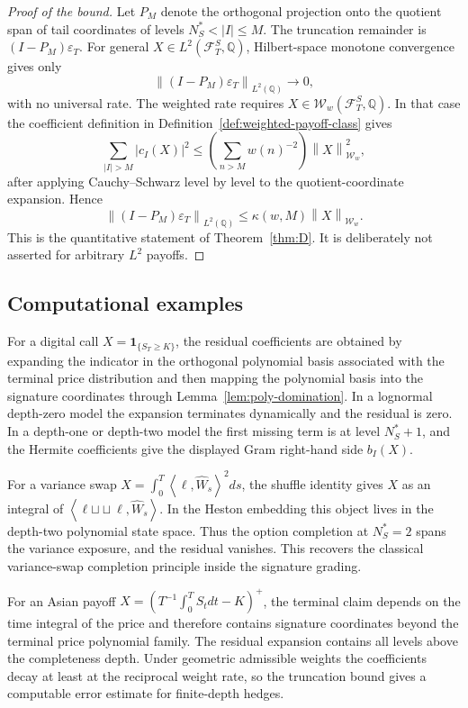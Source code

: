 \documentclass[11pt,oneside]{article}
\theoremstyle{plain}
\theoremstyle{definition}
\theoremstyle{remark}
\newcommand{\Q}{\mathbb{Q}}
\newcommand{\cW}{\widehat W}
\newcommand{\FS}{\mathcal F^S}
\newcommand{\sh}{\mathbin{\sqcup\!\sqcup}}
\newcommand{\norm}[1]{\left\lVert #1\right\rVert}
\newcommand{\abs}[1]{\left\lvert #1\right\rvert}
\newcommand{\inner}[2]{\left\langle #1,#2\right\rangle}
\begin{document}
\begin{proof}[Proof of the bound]
Let $P_M$ denote the orthogonal projection onto the quotient span of tail coordinates of levels $N_S^\ast<|I|\leq M$. The truncation remainder is $(I-P_M)\varepsilon_T$. For general $X\in L^2(\FS_T,\Q)$, Hilbert-space monotone convergence gives only
\[
\norm{(I-P_M)\varepsilon_T}_{L^2(\Q)}\to0,
\]
with no universal rate. The weighted rate requires $X\in\mathcal W_w(\FS_T,\Q)$. In that case the coefficient definition in Definition~\ref{def:weighted-payoff-class} gives
\[
\sum_{|I|>M}\abs{c_I(X)}^2
\leq
\left(\sum_{n>M}w(n)^{-2}\right)\norm{X}_{\mathcal W_w}^2,
\]
after applying Cauchy--Schwarz level by level to the quotient-coordinate expansion. Hence
\[
\norm{(I-P_M)\varepsilon_T}_{L^2(\Q)}
\leq
\kappa(w,M)\norm{X}_{\mathcal W_w}.
\]
This is the quantitative statement of Theorem~\ref{thm:D}. It is deliberately not asserted for arbitrary $L^2$ payoffs.
\end{proof}

\subsection{Computational examples}

For a digital call $X=\mathbf 1_{\{S_T\geq K\}}$, the residual coefficients are obtained by expanding the indicator in the orthogonal polynomial basis associated with the terminal price distribution and then mapping the polynomial basis into the signature coordinates through Lemma~\ref{lem:poly-domination}. In a lognormal depth-zero model the expansion terminates dynamically and the residual is zero. In a depth-one or depth-two model the first missing term is at level $N_S^\ast+1$, and the Hermite coefficients give the displayed Gram right-hand side $b_I(X)$.

For a variance swap $X=\int_0^T\inner{\ell}{\cW_s}^2ds$, the shuffle identity gives $X$ as an integral of $\inner{\ell\sh\ell}{\cW_s}$. In the Heston embedding this object lives in the depth-two polynomial state space. Thus the option completion at $N_S^\ast=2$ spans the variance exposure, and the residual vanishes. This recovers the classical variance-swap completion principle inside the signature grading.

For an Asian payoff $X=(T^{-1}\int_0^T S_tdt-K)^+$, the terminal claim depends on the time integral of the price and therefore contains signature coordinates beyond the terminal price polynomial family. The residual expansion contains all levels above the completeness depth. Under geometric admissible weights the coefficients decay at least at the reciprocal weight rate, so the truncation bound gives a computable error estimate for finite-depth hedges.
\end{document}

